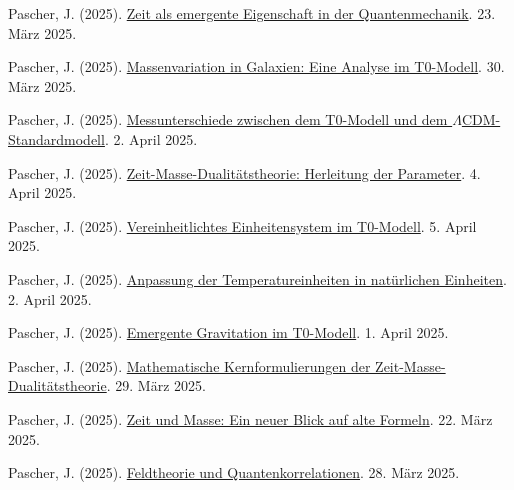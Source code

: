 \documentclass[12pt,a4paper]{article}
\begin{document}
	\begin{thebibliography}{99}
		 Pascher, J. (2025). \href{https://github.com/jpascher/T0-Time-Mass-Duality/tree/main/2/pdf/Deutsch/ZeitEmergentQM.pdf}{Zeit als emergente Eigenschaft in der Quantenmechanik}. 23. März 2025.
		
		 Pascher, J. (2025). \href{https://github.com/jpascher/T0-Time-Mass-Duality/tree/main/2/pdf/Deutsch/MassVarGalaxien.pdf}{Massenvariation in Galaxien: Eine Analyse im T0-Modell}. 30. März 2025.
		
		 Pascher, J. (2025). \href{https://github.com/jpascher/T0-Time-Mass-Duality/tree/main/2/pdf/Deutsch/MessdifferenzenT0Standard.pdf}{Messunterschiede zwischen dem T0-Modell und dem $\Lambda$CDM-Standardmodell}. 2. April 2025.
		
		 Pascher, J. (2025). \href{https://github.com/jpascher/T0-Time-Mass-Duality/tree/main/2/pdf/Deutsch/ZeitMasseT0Params.pdf}{Zeit-Masse-Dualitätstheorie: Herleitung der Parameter}. 4. April 2025.
		
		 Pascher, J. (2025). \href{https://github.com/jpascher/T0-Time-Mass-Duality/tree/main/2/pdf/Deutsch/Alpha1Beta1Konsistenz.pdf}{Vereinheitlichtes Einheitensystem im T0-Modell}. 5. April 2025.
		
		 Pascher, J. (2025). \href{https://github.com/jpascher/T0-Time-Mass-Duality/tree/main/2/pdf/Deutsch/TempEinheitenCMB.pdf}{Anpassung der Temperatureinheiten in natürlichen Einheiten}. 2. April 2025.
		
		 Pascher, J. (2025). \href{https://github.com/jpascher/T0-Time-Mass-Duality/tree/main/2/pdf/Deutsch/EmergentGravT0.pdf}{Emergente Gravitation im T0-Modell}. 1. April 2025.
		
		 Pascher, J. (2025). \href{https://github.com/jpascher/T0-Time-Mass-Duality/tree/main/2/pdf/Deutsch/MathZeitMasseLagrange.pdf}{Mathematische Kernformulierungen der Zeit-Masse-Dualitätstheorie}. 29. März 2025.
		
		 Pascher, J. (2025). \href{https://github.com/jpascher/T0-Time-Mass-Duality/tree/main/2/pdf/Deutsch/ZeitMasseNeuerBlick.pdf}{Zeit und Masse: Ein neuer Blick auf alte Formeln}. 22. März 2025.
		
		 Pascher, J. (2025). \href{https://github.com/jpascher/T0-Time-Mass-Duality/tree/main/2/pdf/Deutsch/FeldtheorieQuanten.pdf}{Feldtheorie und Quantenkorrelationen}. 28. März 2025.
		

\end{thebibliography}
\end{document}

